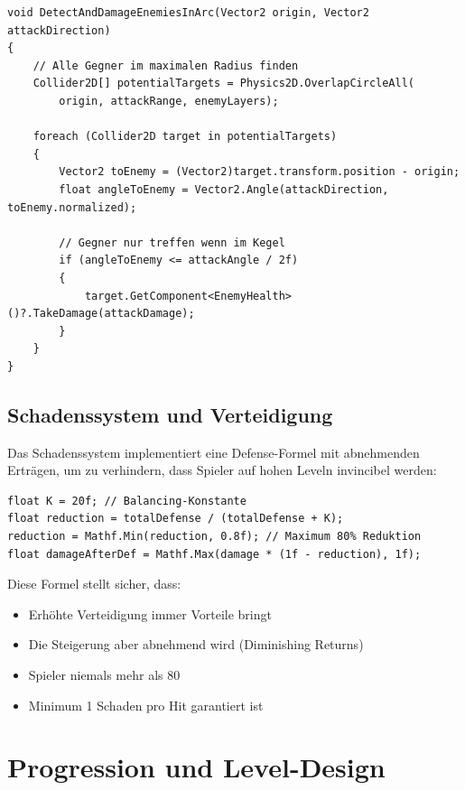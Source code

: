 \documentclass[
  a4paper,
  11pt,
  ngerman,
  parskip=half,
  bibliography=totoc,
  listof=totoc
]{scrreprt}
\begin{document}
\begin{lstlisting}[caption={Arc-basierte Treffererkennung (PlayerCombat.cs)}, label=lst:combat_arc]
void DetectAndDamageEnemiesInArc(Vector2 origin, Vector2 attackDirection)
{
    // Alle Gegner im maximalen Radius finden
    Collider2D[] potentialTargets = Physics2D.OverlapCircleAll(
        origin, attackRange, enemyLayers);

    foreach (Collider2D target in potentialTargets)
    {
        Vector2 toEnemy = (Vector2)target.transform.position - origin;
        float angleToEnemy = Vector2.Angle(attackDirection, toEnemy.normalized);

        // Gegner nur treffen wenn im Kegel
        if (angleToEnemy <= attackAngle / 2f)
        {
            target.GetComponent<EnemyHealth>()?.TakeDamage(attackDamage);
        }
    }
}
\end{lstlisting}

\subsection{Schadenssystem und Verteidigung}

Das Schadenssystem implementiert eine Defense-Formel mit abnehmenden Erträgen, um zu verhindern, dass Spieler auf hohen Leveln invincibel werden:

\begin{lstlisting}[caption={Defense-Formel mit Diminishing Returns}, label=lst:defense_formula]
float K = 20f; // Balancing-Konstante
float reduction = totalDefense / (totalDefense + K);
reduction = Mathf.Min(reduction, 0.8f); // Maximum 80% Reduktion
float damageAfterDef = Mathf.Max(damage * (1f - reduction), 1f);
\end{lstlisting}

Diese Formel stellt sicher, dass:
\begin{itemize}
    \item Erhöhte Verteidigung immer Vorteile bringt
    \item Die Steigerung aber abnehmend wird (Diminishing Returns)
    \item Spieler niemals mehr als 80%
    \item Minimum 1 Schaden pro Hit garantiert ist
\end{itemize}

\section{Progression und Level-Design}
\end{document}
